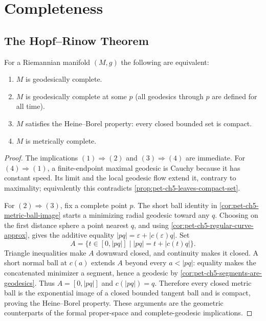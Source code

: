 \section{Completeness}

\subsection{The Hopf–Rinow Theorem}

\begin{theorem}
  \label{thm:pet-ch5-hopf-rinow}


  For a Riemannian manifold $(M,g)$ the following are equivalent:
  \begin{enumerate}
  \item[(1)] $M$ is geodesically complete.
  \item[(2)] $M$ is geodesically complete at some $p$ (all geodesics through $p$
  are defined for all time).
  \item[(3)] $M$ satisfies the Heine–Borel property: every closed bounded set is
  compact.
  \item[(4)] $M$ is metrically complete.
  \end{enumerate}
\end{theorem}
\begin{proof}

  \sketch
  The implications $(1)\Rightarrow(2)$ and $(3)\Rightarrow(4)$ are immediate.
  For $(4)\Rightarrow(1)$, a finite-endpoint maximal geodesic is Cauchy because it
  has constant speed.  Its limit and the local geodesic flow extend it, contrary to
  maximality; equivalently this contradicts
  \cref{prop:pet-ch5-leaves-compact-set}.

  For $(2)\Rightarrow(3)$, fix a complete point $p$.  The short ball identity in
  \cref{cor:pet-ch5-metric-ball-image} starts a minimizing radial geodesic toward
  any $q$.  Choosing on the first distance sphere a point nearest $q$, and using
  \cref{cor:pet-ch5-regular-curve-approx}, gives the additive equality
  $|pq|=\varepsilon+|c(\varepsilon)q|$.  Set
  \[
    A=\{t\in[0,|pq|]\mid |pq|=t+|c(t)q|\}.
  \]
  Triangle inequalities make $A$ downward closed, and continuity makes it closed.
  A short normal ball at $c(a)$ extends $A$ beyond every $a<|pq|$: equality makes
  the concatenated minimizer a segment, hence a geodesic by
  \cref{cor:pet-ch5-segments-are-geodesics}.  Thus $A=[0,|pq|]$ and $c(|pq|)=q$.
  Therefore every closed metric ball is the exponential image of a closed bounded
  tangent ball and is compact, proving the Heine--Borel property.  These arguments
  are the geometric counterparts of the formal proper-space and complete-geodesic
  implications.
\end{proof}

